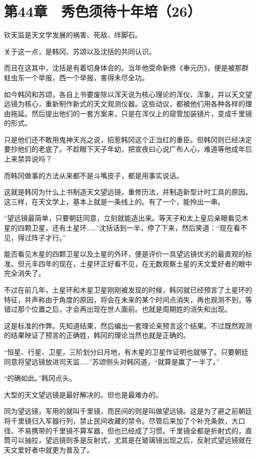 \section{第44章　秀色须待十年培（26）}

钦天监是天文学发展的祸害、死敌、绊脚石。

关于这一点，是韩冈、苏颂以及沈括的共同认识。

而且在这其中，沈括是有着切身体会的。当年他受命新修《奉元历》，便是被那群蛀虫东一个举报，西一个举报，害得未尽全功。

如今韩冈和苏颂，各自上书要废除以浑天说为核心理论的浑仪、浑象，并以天文望远镜为核心，重新制作新式的天文观测仪器。这些动议，都被他们用各种各样的理由拖延。然后提出他们的一套方案来，只是在浑仪上的窥管加装镜片，变成千里镜的形式。

只是他们还不敢用鬼神天兆之说，招惹韩冈这个正当红的重臣。但韩冈则已经决定要抄他们的老底了。不趁眼下天子年幼，把宣夜曰心说广布人心，难道等他成年后上来禁异说吗？

而韩冈做事的方法从来都不是斗嘴皮子，都是用事实说话。

这就是韩冈为什么上书制造天文望远镜，重修历法，并制造新型计时工具的原因。这三样，在天文学上，基本上就是一条线上的。有了一个，能拎出一串。

“望远镜最简单，只要朝廷同意，立刻就能造出来。等天子和太上皇后亲眼看见木星的四颗卫星，还有土星环……”沈括话到一半，停了下来，然后笑道：“现在看不见，得过阵子才行。”

能否看见木星的四颗卫星以及土星的外环，便是评价一具望远镜优劣的最直观的标准。但元丰四年的现在，土星环正好看不见，在无数观察土星的天文爱好者的眼中完全消失了。

不过在前几年，土星环和木星卫星刚刚被发现的时候，韩冈就已经预言了土星环的特征，并声称由于角度的原因，将会在未来的某个时间点消失，再也观测不到，等错过那个位置之后，才会再出现在世人面前。也就是周期姓的消失和出现。

这是标准的作弊。先知道结果，然后编出一套理论来预言这个结果。不过既然观测的结果映证了预言的正确姓，韩冈的理论当然也就是正确的。

“恒星、行星、卫星，三阶划分曰月地，有木星的卫星作证明也就够了。只要朝廷同意将望远镜放进司天监……”苏颂侧头对韩冈道，“就算是赢了一半了。”

“的确如此。”韩冈点头。

大型的天文望远镜是最好解决的。但也是最难办的。

同为望远镜，军用的就叫千里镜，而民间的则是叫做望远镜。这是为了避之前朝廷将千里镜归入军器行列，禁止民间收藏的禁令。尽管后来加了个补充条款，大口径、不易携带的千里镜不算军器，但也已经成了习惯。千里镜全都是折射式的，直筒可以抽拉，望远镜则多是反射式，尤其是在玻璃镜出现之后，反射式望远镜就在天文爱好者中就更为普及了。

